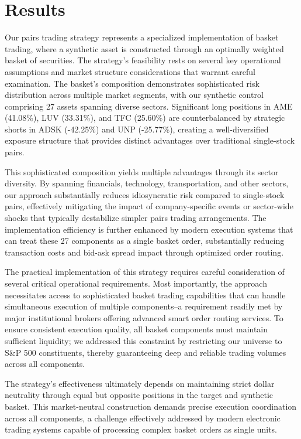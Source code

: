 \section{Results} \label{sec:results}

Our pairs trading strategy represents a specialized implementation of basket trading, where a synthetic asset is constructed through an optimally weighted basket of securities. The strategy's feasibility rests on several key operational assumptions and market structure considerations that warrant careful examination. The basket's composition demonstrates sophisticated risk distribution across multiple market segments, with our synthetic control comprising 27 assets spanning diverse sectors. Significant long positions in AME (41.08\%), LUV (33.31\%), and TFC (25.60\%) are counterbalanced by strategic shorts in ADSK (-42.25\%) and UNP (-25.77\%), creating a well-diversified exposure structure that provides distinct advantages over traditional single-stock pairs.

This sophisticated composition yields multiple advantages through its sector diversity. By spanning financials, technology, transportation, and other sectors, our approach substantially reduces idiosyncratic risk compared to single-stock pairs, effectively mitigating the impact of company-specific events or sector-wide shocks that typically destabilize simpler pairs trading arrangements. The implementation efficiency is further enhanced by modern execution systems that can treat these 27 components as a single basket order, substantially reducing transaction costs and bid-ask spread impact through optimized order routing.

The practical implementation of this strategy requires careful consideration of several critical operational requirements. Most importantly, the approach necessitates access to sophisticated basket trading capabilities that can handle simultaneous execution of multiple components--a requirement readily met by major institutional brokers offering advanced smart order routing services. To ensure consistent execution quality, all basket components must maintain sufficient liquidity; we addressed this constraint by restricting our universe to S\&P 500 constituents, thereby guaranteeing deep and reliable trading volumes across all components.

The strategy's effectiveness ultimately depends on maintaining strict dollar neutrality through equal but opposite positions in the target and synthetic basket. This market-neutral construction demands precise execution coordination across all components, a challenge effectively addressed by modern electronic trading systems capable of processing complex basket orders as single units. 

